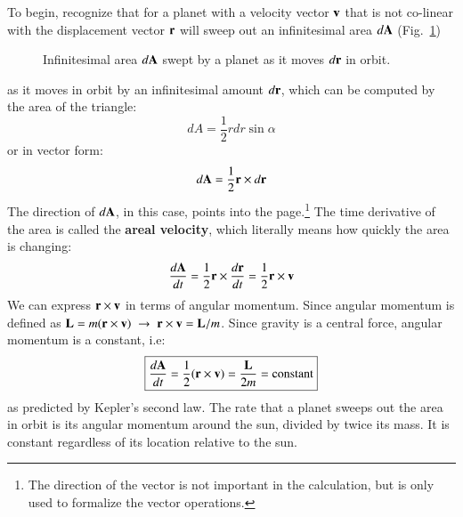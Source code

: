 \documentclass{../../../oss-handout}
\newcommand{\mb}[1]{\ensuremath\mathbf{#1}}
\begin{document}
To begin, recognize that for a planet with a velocity vector $\mb{v}$ that is
not co-linear with the displacement vector $\mb{r}$ will sweep out an
infinitesimal area $d\mb{A}$ (Fig.~\ref{fig:dA})
\begin{figure}[ht]
  \centering
  \caption{Infinitesimal area $d\mb{A}$ swept by a planet as it moves
    $d\mb{r}$ in orbit.}
  \label{fig:dA}
\end{figure}
as it moves in orbit by an infinitesimal amount $d\mb{r}$, which can be
computed by the area of the triangle:
\begin{equation}
  dA=\frac12rdr\sin\alpha
\end{equation}
or in vector form:
\begin{equation}
  d\mb{A}=\frac12\mb{r}\times d\mb{r}
\end{equation}
The direction of $d\mb{A}$, in this case, points into the
page.\footnote{The direction of the vector is not important in the calculation,
  but is only used to formalize the vector operations.} The time derivative of
the area is called the \textbf{areal velocity}, which literally means how
quickly the area is changing:
\begin{equation}
  \frac{d\mb{A}}{dt}
  =\frac12\mb{r}\times\frac{d\mb{r}}{dt}
  =\frac12\mb{r}\times\mb{v}
\end{equation}
We can express $\mb{r}\times\mb{v}$ in terms of angular momentum. Since angular
momentum is defined as $\mb{L}=m(\mb{r}\times\mb{v})\;\rightarrow\;
\mb{r}\times\mb{v}=\mb{L}/m$. Since gravity is a central force, angular
momentum is a constant, i.e:
\begin{equation}
  \boxed{\frac{d\mb{A}}{dt}
    =\frac12(\mb{r}\times\mb{v})=\frac{\mb{L}}{2m}=
    \text{constant}
  }
  \label{constant}
\end{equation}
as predicted by Kepler's second law. The rate that a planet sweeps out the area
in orbit is its angular momentum around the sun, divided by twice its mass. It
is constant regardless of its location relative to the sun.
\end{document}
